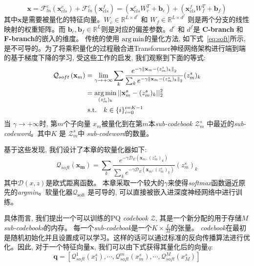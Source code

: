 \begin{equation}
    \mathbf{x} = \mathcal{F}_{ln}^c(\mathbf{x}^c_{cls}) + \mathcal{F}_{ln}^c(\mathbf{x}^f_{cls}) = (\mathbf{x}^c_{cls} W_c^T + \mathbf{b}_c) + ( \mathbf{x}^f_{cls} W_f^T + \mathbf{b}_f)
\end{equation}
其中$ \mathbf{x}$是需要被量化的特征向量。$W_c \in \mathbb{R}^{L \times d^c }$ 和  $W_f \in \mathbb{R}^{L \times d^f}$ 则是两个分支的线性映射的权重矩阵。而 $\mathbf{b}_c, \mathbf{b}_f \in \mathbb{R}^{L}$则是对应的偏差参数。$d^c$ 和 $d^f$是  \textbf{C-branch} 和 \textbf{F-branch}的嵌入的维度。 传统的使用 $\operatorname*{arg\,min}$的量化方法, 如下式~\ref{eq:soft}所示, 是不可导的。为了将乘积量化的过程融合进Transformer神经网络架构进行端到端的基于梯度下降的学习, 受这些工作\cite{arandjelovic2016netvlad,yu2018product}的启发, 我们观察到下面的等式:
\begin{equation}
    \label{eq:soft}
    \begin{aligned}
    \mathcal{Q}_{soft}\left(\mathbf{x}_{m}\right) &=\lim _{\gamma \rightarrow+\infty} \sum_{k} \frac{e^{-\gamma\left\|\mathbf{x}_{m}-(z_m^s)_k\right\|_{2}}}{\sum_{k} e^{-\gamma\left\|\mathbf{x}_{m}-(z_m^s)_k\right\|_{2}}} (z_m^s)_k \\
    & = \operatorname*{arg\,min}_{(z^s_m)_k} ||\mathbf{x}_m^s - (z^s_m)_k ||_2^2  \\
    &\text { s.t.}  \quad k \in  \{i\}_{i=0}^{i=K-1}
    \end{aligned}
\end{equation}
当 $\gamma \rightarrow+\infty$时,  第$m$个子向量 $x_m$被量化到在第$m$本\textit{sub-codebook}  $\mathcal{Z}_m^s$ 中最近的\textit{sub-codeword}。其中$K$ 是 $\mathcal{Z}_m^s$中 \textit{sub-codeword}的数量。\par
基于这些发现, 我们设计了本章的软量化器如下:
\begin{equation}
    \mathcal{Q}_{soft}(\mathbf{x_m}) = \sum_{k} \frac{e^{-\gamma \mathcal{D}_E(\mathbf{x}_{m},(z_m^s)_k)}}{\sum_{k} e^{-\gamma \mathcal{D}_E(\mathbf{x}_{m},(z_m^s)_k)}} (z_m^s)_k 
\end{equation}
其中$\mathcal{D}(x,z)$是欧式距离函数。 本章采取一个较大的$\gamma$来使得\textit{softmax}函数逼近原先的\textit{argmin}。软量化器$\mathcal{Q}_{\text{soft}}$ 是可导的, 可以直接被嵌入进深度神经网络中进行训练。\par
具体而言, 我们提出一个可以训练的{PQ} \textit{codebook} $\mathcal{Z}$, 其是一个新分配的用于存储$M$\textit{sub-codebooks}的内存。 每一个\textit{sub-codebook}是一个$K \times \frac{L}{M}$的张量。 \textit{codebook}在最初是随机初始化并且设置成可以学习。这样的话可以通过标准的反向传播算法进行优化。因此, 对于一个特征向量$\textbf{x}$, 我们可以由下式获得其量化后的向量$q$:
\begin{equation}
    \label{eq:quantizer}
        \textbf{q} = [\mathcal{Q}^1_{soft}(x^s_1),\cdots,\mathcal{Q}^m_{soft}(x^s_m),\cdots,\mathcal{Q}^M_{soft}(x^s_M)]
    \end{equation}
    
